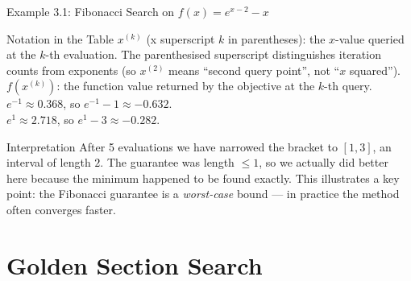 \documentclass[aspectratio=169,10pt]{beamer}
\begin{document}
\begin{frame}[allowframebreaks]{Example 3.1: Fibonacci Search on $f(x) = e^{x-2} - x$}
  \medskip
  \begin{block}{Notation in the Table}
    $x^{(k)}$ (x superscript $k$ in parentheses): the $x$-value queried at
    the $k$-th evaluation.  The parenthesised superscript distinguishes
    iteration counts from exponents (so $x^{(2)}$ means ``second query
    point'', not ``$x$ squared'').\\
    $f(x^{(k)})$: the function value returned by the objective at the
    $k$-th query.\\
    $e^{-1} \approx 0.368$, so $e^{-1} - 1 \approx -0.632$.\\
    $e^{1} \approx 2.718$, so $e^{1} - 3 \approx -0.282$.
  \end{block}

  \begin{exampleblock}{Interpretation}
    After 5 evaluations we have narrowed the bracket to $[1, 3]$, an interval
    of length $2$.  The guarantee was length $\le 1$, so we actually did
    better here because the minimum happened to be found exactly.  This
    illustrates a key point: the Fibonacci guarantee is a \emph{worst-case}
    bound --- in practice the method often converges faster.
  \end{exampleblock}

\end{frame}

\section{Golden Section Search}
\end{document}

